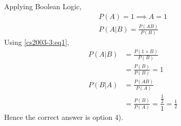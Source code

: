 Applying Boolean Logic,\begin{align}P(A)=1 \implies A=1\label{cs2003-3:eq1}\\ P(A|B)=\frac{P(AB)}{P(B)} \end{align} Using \eqref{cs2003-3:eq1}, \begin{align} P(A|B)&=\frac{P(1\times B)}{P(B)}\\ &=\frac{P(B)}{P(B)}=1\\ P(B|A)&=\frac{P(AB)}{P(A)}\\ &=\frac{P(B)}{P(A)}=\dfrac{\frac{1}{2}}{1}=\frac{1}{2}\end{align}Hence the correct answer is option 4).

